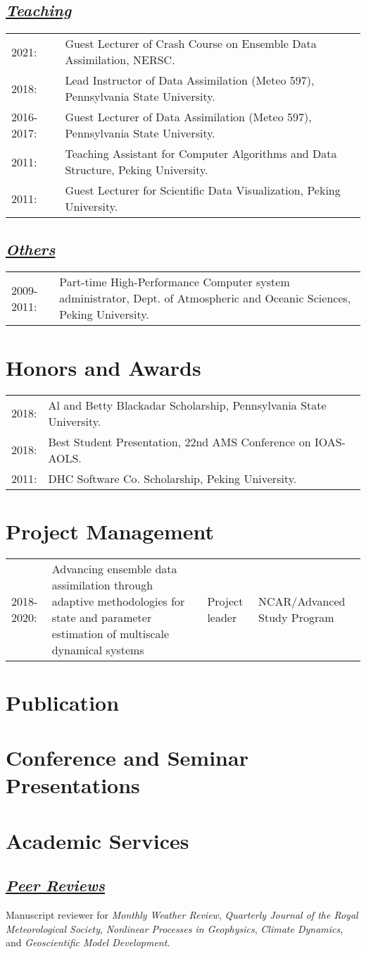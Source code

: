 \documentclass{article}
\newcommand{\cvsection}[1]{\section*{\bfseries#1}}
\newcommand{\cvsubsection}[1]{\subsection*{\itshape\uline{#1}}}
\begin{document}
\cvsubsection{Teaching}
\begin{tabular}{l l}
    2021: & Guest Lecturer of Crash Course on Ensemble Data Assimilation, NERSC. \\
    2018: & Lead Instructor of Data Assimilation (Meteo 597), Pennsylvania State University. \\
    2016-2017: & Guest Lecturer of Data Assimilation (Meteo 597), Pennsylvania State University. \\
    2011: & Teaching Assistant for Computer Algorithms and Data Structure, Peking University. \\
    2011: & Guest Lecturer for Scientific Data Visualization, Peking University. \\
\end{tabular}

\cvsubsection{Others}
\begin{tabular}{l p{14cm}}
    2009-2011: & Part-time High-Performance Computer system administrator, Dept. of Atmospheric and Oceanic Sciences, Peking University. \\
\end{tabular}

\cvsection{Honors and Awards}
\begin{tabular}{l l}
    2018: & Al and Betty Blackadar Scholarship, Pennsylvania State University. \\
    2018: & Best Student Presentation, 22nd AMS Conference on IOAS-AOLS. \\
    2011: & DHC Software Co. Scholarship, Peking University. \\
\end{tabular}


\cvsection{Project Management}
\begin{tabular}{l p{8cm} p{2cm} p{3cm}}
    2018-2020: & Advancing ensemble data assimilation through adaptive methodologies for state and parameter estimation of multiscale dynamical systems & Project leader & NCAR/Advanced Study Program \\
\end{tabular}


\cvsection{Publication}


\cvsection{Conference and Seminar Presentations}


\cvsection{Academic Services}
\cvsubsection{Peer Reviews}
Manuscript reviewer for
\textit{Monthly Weather Review},
\textit{Quarterly Journal of the Royal Meteorological Society},
\textit{Nonlinear Processes in Geophysics},
\textit{Climate Dynamics},
and
\textit{Geoscientific Model Development}.
\end{document}
